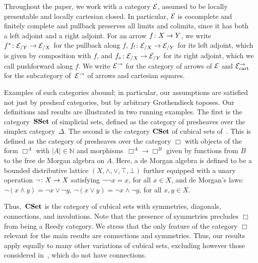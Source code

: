 \documentclass[reqno,10pt,a4paper,oneside,draft]{amsart}
\begin{document}
Throughout the paper, we work with a category $\cal{E}$, assumed to be locally presentable and locally cartesian closed.
In particular, $\catE$ is cocomplete and finitely complete and pullback preserves all limits and colimits, since it has both a left adjoint and a right adjoint.
For an arrow $f \co X \to Y$, we write $f^* \co \cal{E}_{/Y} \to \cal{E}_{/X}$ for the pullback along $f$, $f_{!} \co \cal{E}_{/X} \to \cal{E}_{/Y}$ for its left adjoint, which is given by composition with $f$, and $f_* \co \cal{E}_{/X} \to \cal{E}_{/Y}$ for its right adjoint, which we call pushforward along $f$.
We write $\cal{E}^\to$ for the category of arrows of $\cal{E}$ and $\cal{E}^\to_{\mathrm{cart}}$ for the subcategory of~$\cal{E}^\to$ of arrows and cartesian squares.

Examples of such categories abound; in particular, our assumptions are satisfied not just by presheaf categories, but by arbitrary Grothendieck toposes.
Our definitions and results are illustrated in two running examples.
The first is the category~$\SSet$ of simplicial sets, defined as the category of presheaves over the simplex category~$\Delta$.
The second is the category $\CSet$ of cubical sets of~\cite{cohen-et-al:cubicaltt}.
This is defined as the category of presheaves over the category $\Box$ with objects of the form $\Box^A$ with $|A| \in \mathbb{N}$ and morphisms~$\Box^A \to \Box^B$ given by functions from $B$ to the free de Morgan algebra on 
$A$. Here, a de Morgan algebra is defined to be a bounded distributive lattice $(X, \land, \lor, \top, \bot)$ further equipped with a unary operation $\neg \co X \to X$ satisfying $\neg \neg x = x$, for all $x \in X$, and de Morgan's laws: $\neg (x \land y) = \neg x \lor \neg y$, $\neg (x \lor y) = \neg x \land \neg y$, for all $x, y \in X$. 


Thus,~$\CSet$ is the category of cubical sets with symmetries, diagonals, connections, and involutions.
Note that the presence of symmetries precludes $\Box$ from being a Reedy category.
We stress that the only feature of the category $\Box$ relevant for the main results are connections and symmetries.
Thus, our results apply equally to many other variations of cubical sets, excluding however those considered in~\cite{coquand-cubical-sets,huber-thesis}, which do not have connections.
\end{document}
